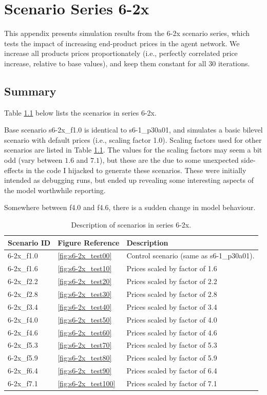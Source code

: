 \chapter{Scenario Series 6-2x}

This appendix presents simulation results from the 6-2x scenario series, which tests the impact of increasing end-product prices in the agent network. We increase all products prices proportionately (i.e., perfectly correlated price increase, relative to base values), and keep them constant for all 30 iterations. 

\section{Summary}
Table \ref{tab:scenario_list} below lists the scenarios in series 6-2x.
 
Base scenario s6-2x\_f1.0 is identical to s6-1\_p30a01, and simulates a basic bilevel scenario with default prices (i.e., scaling factor 1.0).
Scaling factors used for other scenarios are listed in Table \ref{tab:scenario_list}. The values for the scaling factors may seem a bit odd (vary between $1.6$ and $7.1$), but these are the due to some unexpected side-effects in the code I hijacked to generate these scenarios. These were initially intended as debugging runs, but ended up revealing some interesting aspects of the model worthwhile reporting.

Somewhere between f4.0 and f4.6, there is a sudden change in model behaviour.

\begin{table}
  \centering
  \begin{tabular}{lll}
    \hline
    Scenario ID & Figure Reference & Description \\
    \hline
    6-2x\_f1.0 & \ref{fig:s6-2x_test00} & Control scenario (same as s6-1\_p30a01). \\
    6-2x\_f1.6 & \ref{fig:s6-2x_test10} & Prices scaled by factor of 1.6 \\
    6-2x\_f2.2 & \ref{fig:s6-2x_test20} & Prices scaled by factor of 2.2 \\
    6-2x\_f2.8 & \ref{fig:s6-2x_test30} & Prices scaled by factor of 2.8 \\
    6-2x\_f3.4 & \ref{fig:s6-2x_test40} & Prices scaled by factor of 3.4 \\
    6-2x\_f4.0 & \ref{fig:s6-2x_test50} & Prices scaled by factor of 4.0 \\
    6-2x\_f4.6 & \ref{fig:s6-2x_test60} & Prices scaled by factor of 4.6 \\
    6-2x\_f5.3 & \ref{fig:s6-2x_test70} & Prices scaled by factor of 5.3 \\
    6-2x\_f5.9 & \ref{fig:s6-2x_test80} & Prices scaled by factor of 5.9 \\
    6-2x\_f6.4 & \ref{fig:s6-2x_test90} & Prices scaled by factor of 6.4 \\
    6-2x\_f7.1 & \ref{fig:s6-2x_test100} & Prices scaled by factor of 7.1 \\
    \hline
  \end{tabular}
  \caption{Description of scenarios in series 6-2x.}
  \label{tab:scenario_list}
\end{table}


